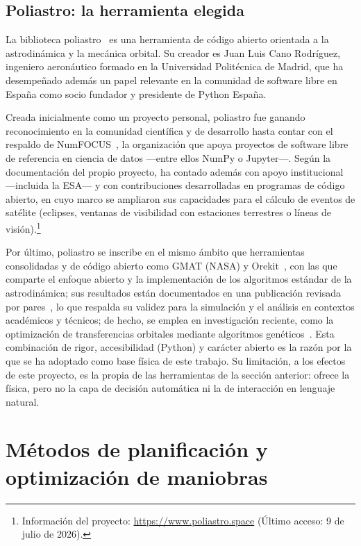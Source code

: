 {\subsection{Poliastro: la herramienta elegida}
\label{sec:mot-poliastro}

La biblioteca poliastro~\cite{poliastro} es una herramienta de código abierto orientada a la astrodinámica y la mecánica orbital. Su creador es Juan Luis Cano Rodríguez, ingeniero aeronáutico formado en la Universidad Politécnica de Madrid, que ha desempeñado además un papel relevante en la comunidad de software libre en España como socio fundador y presidente de Python España.

Creada inicialmente como un proyecto personal, poliastro fue ganando reconocimiento en la comunidad científica y de desarrollo hasta contar con el respaldo de NumFOCUS~\cite{numfocus}, la organización que apoya proyectos de software libre de referencia en ciencia de datos ---entre ellos NumPy o Jupyter---. Según la documentación del propio proyecto, ha contado además con apoyo institucional ---incluida la \gls{ESA}--- y con contribuciones desarrolladas en programas de código abierto, en cuyo marco se ampliaron sus capacidades para el cálculo de eventos de satélite (eclipses, ventanas de visibilidad con estaciones terrestres o líneas de visión).\footnote{Información del proyecto: \url{https://www.poliastro.space} (Último acceso: 9 de julio de 2026).}

Por último, poliastro se inscribe en el mismo ámbito que herramientas consolidadas y de código abierto como \gls{GMAT} (\gls{NASA}) y Orekit~\cite{gmat,orekit}, con las que comparte el enfoque abierto y la implementación de los algoritmos estándar de la astrodinámica; sus resultados están documentados en una publicación revisada por pares~\cite{poliastro}, lo que respalda su validez para la simulación y el análisis en contextos académicos y técnicos; de hecho, se emplea en investigación reciente, como la optimización de transferencias orbitales mediante algoritmos genéticos~\cite{geneticpoliastro2025}. Esta combinación de rigor, accesibilidad (Python) y carácter abierto es la razón por la que se ha adoptado como base física de este trabajo. Su limitación, a los efectos de este proyecto, es la propia de las herramientas de la sección anterior: ofrece la física, pero no la capa de decisión automática ni la de interacción en lenguaje natural.

\section{Métodos de planificación y optimización de maniobras}
\label{sec:mot-metodos}

}
